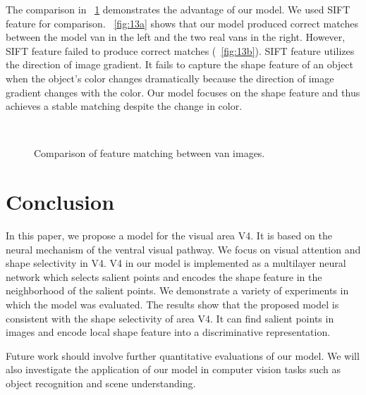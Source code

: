 \documentclass[conference]{IEEEtran}
\begin{document}
The comparison in \figurename~\ref{fig:13} demonstrates the advantage of our model.
We used SIFT feature \cite{lowe2004} for comparison.
\figurename~\ref{fig:13a} shows that our model produced correct matches between 
the model van in the left and the two real vans in the right.
However, SIFT feature failed to produce correct matches (\figurename~\ref{fig:13b}).
SIFT feature utilizes the direction of image gradient.
It fails to capture the shape feature of an object when the object's color changes dramatically
because the direction of image gradient changes with the color.
Our model focuses on the shape feature and thus achieves a stable matching despite the change in color.

\begin{figure}[htp]
\centering
{}\\
\caption{Comparison of feature matching between van images.}
\label{fig:13}
\end{figure}

\section{Conclusion}
\label{sec:5}

In this paper, we propose a model for the visual area V4.
It is based on the neural mechanism of the ventral visual pathway.
We focus on visual attention and shape selectivity in V4.
V4 in our model is implemented as a multilayer neural network 
which selects salient points and encodes the shape feature in the neighborhood of the salient points.
We demonstrate a variety of experiments in which the model was evaluated.
The results show that the proposed model is consistent with the shape selectivity of area V4.
It can find salient points in images and encode local shape feature into a discriminative representation.

Future work should involve further quantitative evaluations of our model.
We will also investigate the application of our model in computer vision tasks
such as object recognition and scene understanding.




\end{document}
